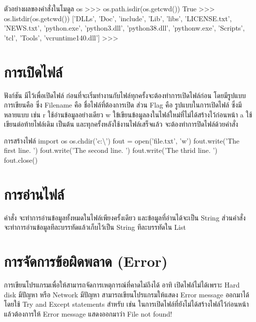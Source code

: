 \begin{codelist}{ตัวอย่างผลของคำสั่งในโมดูล os}{}
>>> os.path.isdir(os.getcwd())
True
>>> os.listdir(os.getcwd())
['DLLs', 'Doc', 'include', 'Lib', 'libs', 'LICENSE.txt', 'NEWS.txt', 'python.exe', 'python3.dll', 'python38.dll', 'pythonw.exe', 'Scripts', 'tcl', 'Tools', 'vcruntime140.dll']
>>>
\end{codelist}


\section{การเปิดไฟล์}

ฟังก์ชัน  มีไว้เพื่อเปิดไฟล์ ก่อนที่จะเริ่มทำงานกับไฟล์ทุกครั้งจะต้องทำการเปิดไฟล์ก่อน โดยมีรูปแบบการเขียนคือ  ซึ่ง Filename คือ ชื่อไฟล์ที่ต้องการเปิด ส่วน Flag คือ รูปแบบในการเปิดไฟล์ ซึ่งมีหลายแบบ เช่น r ใช้อ่านข้อมูลอย่างเดียว w ใข้เขียนข้อมูลลงในไฟล์ใหม่ที่ไม่ได้สร้างไว้ก่อนหน้า a ใช้เขียนต่อท้ายไฟล์เดิม เป็นต้น และทุกครั้งหลังใช้งานไฟล์เสร็จแล้ว จะต้องทำการปิดไฟล์ด้วยคำสั่ง 

\begin{codelist}{การสร้างไฟล์}{}
import os
os.chdir('c:\textbackslash\Users\janta\Desktop')
fout = open('file.txt', 'w')
fout.write('The first line. \n')
fout.write('The second line. \n')
fout.write('The thrid line. \n')
fout.close()
\end{codelist}


\section{การอ่านไฟล์}

คำสั่ง  จะทำการอ่านข้อมูลทั้งหมดในไฟล์เพียงครั้งเดียว และข้อมูลที่อ่านได้จะเป็น String ส่วนคำสั่ง  จะทำการอ่านข้อมูลทีละบรรทัดแล้วเก็บไว้เป็น String ทีละบรรทัดใน List

\section{การจัดการข้อผิดพลาด (Error)}

การเขียนโปรแกรมเพื่อให้สามารถจัดการเหตุการณ์ที่คาดไม่ถึงได้ อาทิ เปิดไฟล์ไม่ได้เพราะ Hard disk มีปัญหา หรือ Network มีปัญหา สามารถเขียนโปรแกรมให้แสดง Error message ออกมาได้ โดยใช้ Try and Except statements สำหรับ  เช่น ในการเปิดไฟล์ที่ยังไม่ได้สร้างไฟล์ไว้ก่อนหน้า แล้วต้องการให้ Error message แสดงออกมาว่า  File not found!

